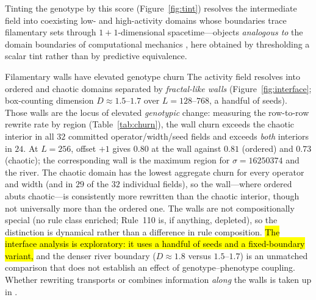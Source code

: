 \documentclass[man,12pt,floatsintext,donotrepeattitle]{apa7}
\newcommand{\weakclaim}[1]{{\sethlcolor{markWeak}\hl{#1}}}
\newcommand{\secref}[1]{\emph{\nameref{#1}}}
\begin{document}
Tinting the genotype by this score (Figure~\ref{fig:tint}) resolves the
intermediate field into coexisting low- and high-activity domains whose
boundaries trace filamentary sets through $1{+}1$-dimensional spacetime---objects
\emph{analogous to} the domain boundaries of computational mechanics
\parencite{crutchfield1989inferring,shalizi2001computational}, here obtained by
thresholding a scalar tint rather than by predictive equivalence.

\begin{empiricalfinding}[label={find:walls}]{Filamentary walls have elevated genotype churn}
The activity field resolves into ordered and chaotic domains separated by
\emph{fractal-like walls} (Figure~\ref{fig:interface}; box-counting dimension
$D \approx 1.5$--$1.7$ over $L = 128$--$768$, a handful of seeds). Those walls are
the locus of elevated \emph{genotypic} change: measuring the row-to-row rewrite
rate by region (Table~\ref{tab:churn}), the wall churn exceeds the chaotic
interior in all $32$ committed operator/width/seed fields and exceeds
\emph{both} interiors in $24$. At $L = 256$, offset $+1$ gives $0.80$ at the
wall against $0.81$ (ordered) and $0.73$ (chaotic); the corresponding wall is
the maximum region for $\sigma=16250374$ and the river. The chaotic domain has
the lowest aggregate churn for every operator and width (and in $29$ of the
$32$ individual fields), so the wall---where ordered abuts chaotic---is
consistently more rewritten than the chaotic interior, though not universally
more than the ordered one. The walls are not compositionally special (no rule
class enriched; Rule~110 is, if anything, depleted), so the distinction is
dynamical rather than a difference in rule composition. \weakclaim{The interface analysis is exploratory: it uses a handful of seeds
and a fixed-boundary variant,} and
the denser river boundary ($D\approx1.8$ versus $1.5$--$1.7$) is an unmatched
comparison that does not establish an effect of genotype--phenotype coupling.
Whether rewriting transports or combines information \emph{along} the walls is
taken up in \secref{sec:eoc-compute}.
\end{empiricalfinding}
\end{document}
